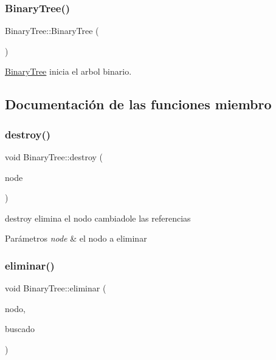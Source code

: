 \subsubsection{\texorpdfstring{Binary\+Tree()}{BinaryTree()}}
{\footnotesize\ttfamily Binary\+Tree\+::\+Binary\+Tree (\begin{DoxyParamCaption}{ }\end{DoxyParamCaption})\hspace{0.3cm}{\ttfamily [inline]}}



\mbox{\hyperlink{class_binary_tree}{Binary\+Tree}} inicia el arbol binario. 



\subsection{Documentación de las funciones miembro}
\mbox{\label{class_binary_tree_adca59e6c9ff7a3c87aa35955ba7897ef}} 
\subsubsection{\texorpdfstring{destroy()}{destroy()}}
{\footnotesize\ttfamily void Binary\+Tree\+::destroy (\begin{DoxyParamCaption}\item[{\mbox{\hyperlink{class_tree_node}{Tree\+Node}} $\ast$}]{node }\end{DoxyParamCaption})\hspace{0.3cm}{\ttfamily [inline]}}



destroy elimina el nodo cambiadole las referencias 


\begin{DoxyParams}{Parámetros}
{\em node} & el nodo a eliminar \\
\hline
\end{DoxyParams}
\mbox{\label{class_binary_tree_a457aa0a390da80c9d732c525dd006d0f}} 
\subsubsection{\texorpdfstring{eliminar()}{eliminar()}}
{\footnotesize\ttfamily void Binary\+Tree\+::eliminar (\begin{DoxyParamCaption}\item[{\mbox{\hyperlink{class_tree_node}{Tree\+Node}} $\ast$}]{nodo,  }\item[{int}]{buscado }\end{DoxyParamCaption})\hspace{0.3cm}{\ttfamily [inline]}}



